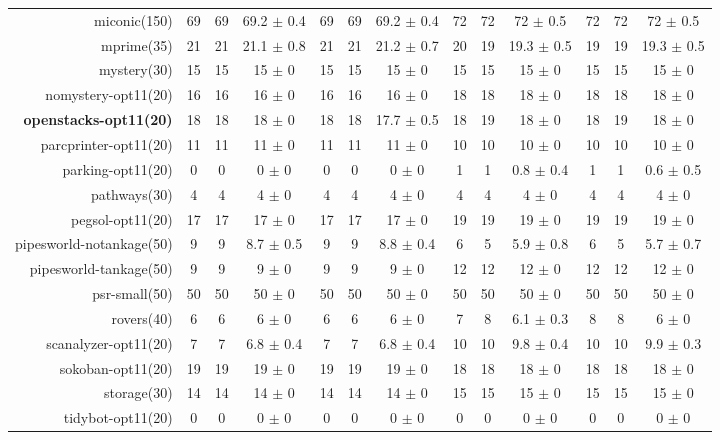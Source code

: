 \begin{center}
\begin{tabular}{|r|*{4}{ccc|}}
miconic(150) & 69 & 69 & 69.2 \(\pm\) 0.4 & 69 & 69 & 69.2 \(\pm\) 0.4 & 72 & 72 & 72 \(\pm\) 0.5 & 72 & 72 & 72 \(\pm\) 0.5\\
mprime(35) & 21 & 21 & 21.1 \(\pm\) 0.8 & 21 & 21 & 21.2 \(\pm\) 0.7 & 20 & 19 & 19.3 \(\pm\) 0.5 & 19 & 19 & 19.3 \(\pm\) 0.5\\
mystery(30) & 15 & 15 & 15 \(\pm\) 0 & 15 & 15 & 15 \(\pm\) 0 & 15 & 15 & 15 \(\pm\) 0 & 15 & 15 & 15 \(\pm\) 0\\
nomystery-opt11(20) & 16 & 16 & 16 \(\pm\) 0 & 16 & 16 & 16 \(\pm\) 0 & 18 & 18 & 18 \(\pm\) 0 & 18 & 18 & 18 \(\pm\) 0\\
\textbf{openstacks-opt11(20)} & 18 & 18 & 18 \(\pm\) 0 & 18 & 18 & 17.7 \(\pm\) 0.5 & 18 & 19 & 18 \(\pm\) 0 & 18 & 19 & 18 \(\pm\) 0\\
parcprinter-opt11(20) & 11 & 11 & 11 \(\pm\) 0 & 11 & 11 & 11 \(\pm\) 0 & 10 & 10 & 10 \(\pm\) 0 & 10 & 10 & 10 \(\pm\) 0\\
parking-opt11(20) & 0 & 0 & 0 \(\pm\) 0 & 0 & 0 & 0 \(\pm\) 0 & 1 & 1 & 0.8 \(\pm\) 0.4 & 1 & 1 & 0.6 \(\pm\) 0.5\\
pathways(30) & 4 & 4 & 4 \(\pm\) 0 & 4 & 4 & 4 \(\pm\) 0 & 4 & 4 & 4 \(\pm\) 0 & 4 & 4 & 4 \(\pm\) 0\\
pegsol-opt11(20) & 17 & 17 & 17 \(\pm\) 0 & 17 & 17 & 17 \(\pm\) 0 & 19 & 19 & 19 \(\pm\) 0 & 19 & 19 & 19 \(\pm\) 0\\
pipesworld-notankage(50) & 9 & 9 & 8.7 \(\pm\) 0.5 & 9 & 9 & 8.8 \(\pm\) 0.4 & 6 & 5 & 5.9 \(\pm\) 0.8 & 6 & 5 & 5.7 \(\pm\) 0.7\\
pipesworld-tankage(50) & 9 & 9 & 9 \(\pm\) 0 & 9 & 9 & 9 \(\pm\) 0 & 12 & 12 & 12 \(\pm\) 0 & 12 & 12 & 12 \(\pm\) 0\\
psr-small(50) & 50 & 50 & 50 \(\pm\) 0 & 50 & 50 & 50 \(\pm\) 0 & 50 & 50 & 50 \(\pm\) 0 & 50 & 50 & 50 \(\pm\) 0\\
rovers(40) & 6 & 6 & 6 \(\pm\) 0 & 6 & 6 & 6 \(\pm\) 0 & 7 & 8 & 6.1 \(\pm\) 0.3 & 8 & 8 & 6 \(\pm\) 0\\
scanalyzer-opt11(20) & 7 & 7 & 6.8 \(\pm\) 0.4 & 7 & 7 & 6.8 \(\pm\) 0.4 & 10 & 10 & 9.8 \(\pm\) 0.4 & 10 & 10 & 9.9 \(\pm\) 0.3\\
sokoban-opt11(20) & 19 & 19 & 19 \(\pm\) 0 & 19 & 19 & 19 \(\pm\) 0 & 18 & 18 & 18 \(\pm\) 0 & 18 & 18 & 18 \(\pm\) 0\\
storage(30) & 14 & 14 & 14 \(\pm\) 0 & 14 & 14 & 14 \(\pm\) 0 & 15 & 15 & 15 \(\pm\) 0 & 15 & 15 & 15 \(\pm\) 0\\
tidybot-opt11(20) & 0 & 0 & 0 \(\pm\) 0 & 0 & 0 & 0 \(\pm\) 0 & 0 & 0 & 0 \(\pm\) 0 & 0 & 0 & 0 \(\pm\) 0\\

\end{tabular}
\end{center}
